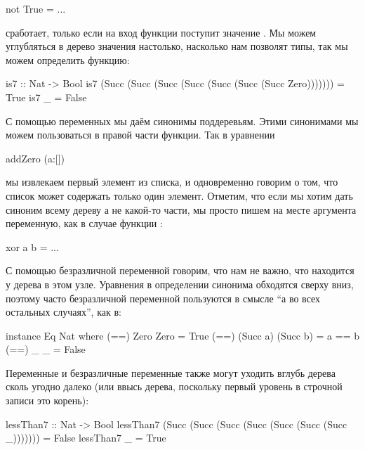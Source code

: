 \begin{code}
not True   = ...
\end{code}

\noindent 

сработает, только если на вход функции поступит значение . Мы
можем углубляться в дерево значения настолько, насколько нам позволят
типы, так мы можем определить функцию:


\begin{code}
is7 :: Nat -> Bool
is7  (Succ (Succ (Succ (Succ (Succ (Succ (Succ Zero)))))))  = True
is7  _                                                      = False
\end{code}

С помощью переменных мы даём синонимы поддеревьям. Этими синонимами мы
можем пользоваться в правой части функции. Так в уравнении


\begin{code}
addZero (a:[])
\end{code}

\noindent 

мы извлекаем первый элемент из списка, и одновременно говорим о том, что
список может содержать только один элемент. Отметим, что если мы хотим
дать синоним всему дереву а не какой-то части, мы просто пишем на месте
аргумента переменную, как в случае функции :


\begin{code}
xor a b = ...
\end{code}

С помощью безразличной переменной говорим, что нам не важно, что
находится у дерева в этом узле. Уравнения в определении синонима
обходятся сверху вниз, поэтому часто безразличной переменной пользуются
в смысле ``а во всех остальных случаях'', как в:


\begin{code}
instance Eq Nat where
    (==) Zero     Zero     = True
    (==) (Succ a) (Succ b) = a == b
    (==) _        _        = False
\end{code}

Переменные и безразличные переменные также могут уходить вглубь дерева
сколь угодно далеко (или ввысь дерева, поскольку первый уровень в
строчной записи это корень):


\begin{code}
lessThan7 :: Nat -> Bool
lessThan7  (Succ (Succ (Succ (Succ (Succ (Succ (Succ _)))))))  = False
lessThan7  _                                                   = True
\end{code}

